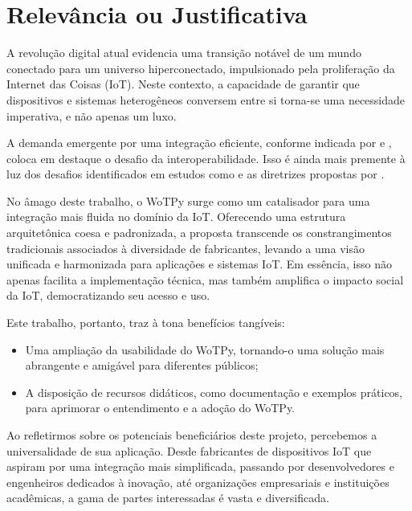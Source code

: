 \chapter{Relevância ou Justificativa}

A revolução digital atual evidencia uma transição notável de um mundo conectado para um universo hiperconectado, impulsionado pela proliferação da Internet das Coisas (IoT). Neste contexto, a capacidade de garantir que dispositivos e sistemas heterogêneos conversem entre si torna-se uma necessidade imperativa, e não apenas um luxo.

A demanda emergente por uma integração eficiente, conforme indicada por  e , coloca em destaque o desafio da interoperabilidade. Isso é ainda mais premente à luz dos desafios identificados em estudos como  e as diretrizes propostas por \cite{OpenApíWoT2021}.

No âmago deste trabalho, o WoTPy surge como um catalisador para uma integração mais fluida no domínio da IoT. Oferecendo uma estrutura arquitetônica coesa e padronizada, a proposta transcende os constrangimentos tradicionais associados à diversidade de fabricantes, levando a uma visão unificada e harmonizada para aplicações e sistemas IoT. Em essência, isso não apenas facilita a implementação técnica, mas também amplifica o impacto social da IoT, democratizando seu acesso e uso.

Este trabalho, portanto, traz à tona benefícios tangíveis:

\begin{itemize}
\item Uma ampliação da usabilidade do WoTPy, tornando-o uma solução mais abrangente e amigável para diferentes públicos;
\item A disposição de recursos didáticos, como documentação e exemplos práticos, para aprimorar o entendimento e a adoção do WoTPy.
\end{itemize}

Ao refletirmos sobre os potenciais beneficiários deste projeto, percebemos a universalidade de sua aplicação. Desde fabricantes de dispositivos IoT que aspiram por uma integração mais simplificada, passando por desenvolvedores e engenheiros dedicados à inovação, até organizações empresariais e instituições acadêmicas, a gama de partes interessadas é vasta e diversificada.

